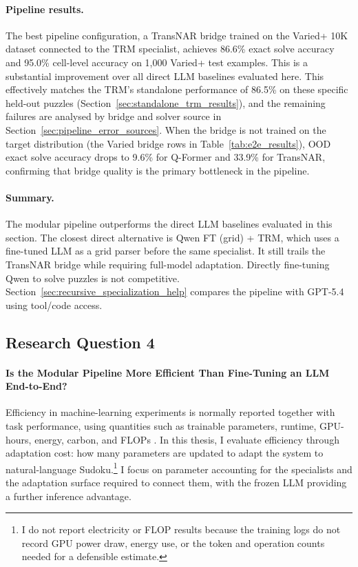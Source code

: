 \documentclass[11pt]{article}
\begin{document}
\paragraph{Pipeline results.}
The best pipeline configuration, a TransNAR bridge trained on the Varied+ 10K dataset connected to the TRM specialist, achieves 86.6\% exact solve accuracy and 95.0\% cell-level accuracy on 1,000 Varied+ test examples.
This is a substantial improvement over all direct LLM baselines evaluated here.
This effectively matches the TRM's standalone performance of 86.5\% on these specific held-out puzzles (Section~\ref{sec:standalone_trm_results}), and the remaining failures are analysed by bridge and solver source in Section~\ref{sec:pipeline_error_sources}.
When the bridge is not trained on the target distribution (the Varied bridge rows in Table~\ref{tab:e2e_results}), OOD exact solve accuracy drops to 9.6\% for Q-Former and 33.9\% for TransNAR, confirming that bridge quality is the primary bottleneck in the pipeline.

\paragraph{Summary.}
The modular pipeline outperforms the direct LLM baselines evaluated in this section.
The closest direct alternative is Qwen FT (grid) + TRM, which uses a fine-tuned LLM as a grid parser before the same specialist.
It still trails the TransNAR bridge while requiring full-model adaptation.
Directly fine-tuning Qwen to solve puzzles is not competitive.
Section~\ref{sec:recursive_specialization_help} compares the pipeline with GPT-5.4 using tool/code access.

\subsection*{Research Question 4}
\label{sec:efficiency}
\label{sec:efficiency_results}

\paragraph{Is the Modular Pipeline More Efficient Than Fine-Tuning an LLM End-to-End?}
Efficiency in machine-learning experiments is normally reported together with task performance, using quantities such as trainable parameters, runtime, GPU-hours, energy, carbon, and FLOPs \cite{schwartzGreenAI2020,JMLR:v21:20-312}.
In this thesis, I evaluate efficiency through adaptation cost: how many parameters are updated to adapt the system to natural-language Sudoku.\footnote{I do not report electricity or FLOP results because the training logs do not record GPU power draw, energy use, or the token and operation counts needed for a defensible estimate.}
I focus on parameter accounting for the specialists and the adaptation surface required to connect them, with the frozen LLM providing a further inference advantage.
\end{document}
